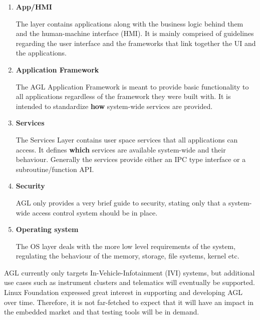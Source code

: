 \begin{enumerate}
\item \textbf{App/HMI}

The layer contains applications along with the business logic behind them and the human-machine interface (HMI). It is mainly comprised of guidelines regarding the user interface and the frameworks that link together the UI and the applications. 
\item \textbf{Application Framework}

The AGL Application Framework is meant to provide basic functionality to all applications regardless of the framework they were built with. It is intended to standardize \textbf{how} system-wide services are provided.
\item \textbf{Services}

The Services Layer contains user space services that all applications can access. It defines \textbf{which} services are available system-wide and their behaviour. Generally the services provide either an IPC type interface or a subroutine/function API.
\item \textbf{Security}

AGL only provides a very brief guide to security, stating only that a system-wide access control system should be in place.
\item \textbf{Operating system}

The OS layer deals with the more low level requirements of the system, regulating the behaviour of the memory, storage, file systems, kernel etc.
\end{enumerate}

AGL currently only targets In-Vehicle-Infotainment (IVI) systems, but additional use cases such as instrument clusters and telematics will eventually be supported. Linux Foundation expressed great interest in supporting and developing AGL over time. Therefore, it is not far-fetched to expect that it will have an impact in the embedded market and that testing tools will be in demand.

